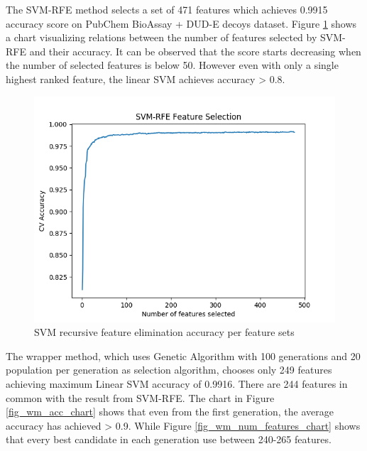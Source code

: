 \documentclass[conference,compsoc,12pt]{IEEEtran}
\begin{document}
	The SVM-RFE method selects a set of 471 features which achieves 0.9915 accuracy score on PubChem BioAssay + DUD-E decoys dataset. Figure \ref{fig_svmrfe_acc_num_features_chart} shows a chart visualizing relations between the number of features selected by SVM-RFE and their accuracy. It can be observed that the score starts decreasing when the number of selected features is below 50. However even with only a single highest ranked feature, the linear SVM achieves accuracy > 0.8.
		
	\begin{figure}
		\includegraphics[scale=0.5]{../images/SVM_RFE_chart.png}
		\caption{SVM recursive feature elimination accuracy per feature sets}
		\label{fig_svmrfe_acc_num_features_chart}
	\end{figure}
	
	The wrapper method, which uses Genetic Algorithm with 100 generations and 20 population per generation as selection algorithm, chooses only 249 features achieving maximum Linear SVM accuracy of 0.9916. There are 244 features in common with the result from SVM-RFE. The chart in Figure \ref{fig_wm_acc_chart} shows that even from the first generation, the average accuracy has achieved > 0.9. While Figure \ref{fig_wm_num_features_chart} shows that every best candidate in each generation use between 240-265 features.
		
\end{document}
